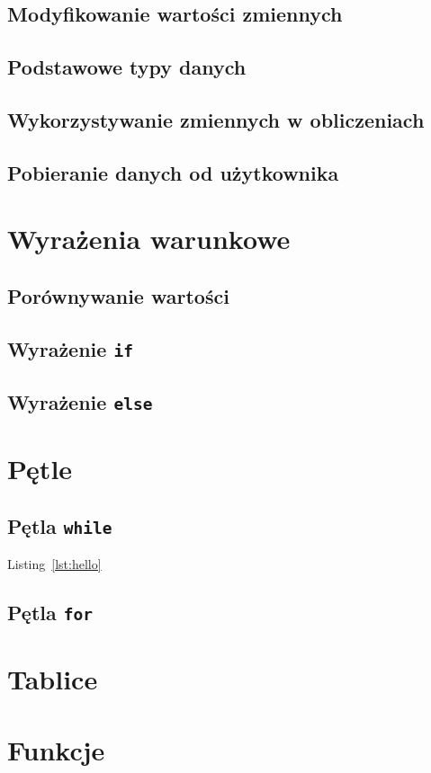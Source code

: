 \documentclass[11pt]{book}
\begin{document}
\section{Modyfikowanie wartości zmiennych}
\section{Podstawowe typy danych}
\section{Wykorzystywanie zmiennych w obliczeniach}
\section{Pobieranie danych od użytkownika}

\chapter{Wyrażenia warunkowe}
\section{Porównywanie wartości}
\section{Wyrażenie \texttt{if}}
\section{Wyrażenie \texttt{else}}

\chapter{Pętle}
\section{Pętla \texttt{while}}
Listing~\ref{lst:hello}
\section{Pętla \texttt{for}}

\chapter{Tablice}

\chapter{Funkcje}
\end{document}
